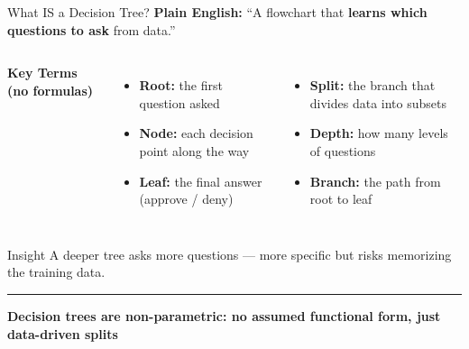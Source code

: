 \documentclass[8pt,aspectratio=169]{beamer}
\newcommand{\bottomnote}[1]{%
\vfill
\vspace{-2mm}
\textcolor{mllavender2}{\rule{\textwidth}{0.4pt}}
\vspace{1mm}
\footnotesize
\textbf{#1}
}
\newenvironment{compactlist}{%
  \begin{itemize}%
    \setlength{\itemsep}{2pt}%
    \setlength{\parskip}{0pt}%
    \setlength{\parsep}{0pt}%
}{%
  \end{itemize}%
}
\newcommand{\highlight}[1]{\textcolor{mlorange}{\textbf{#1}}}
\begin{document}
\begin{frame}[t]{What IS a Decision Tree?}
\small
\textbf{Plain English:} ``A flowchart that \highlight{learns which questions to ask} from data.''

\vspace{3mm}
\footnotesize
\begin{columns}[T]
\textbf{Key Terms (no formulas)}
\begin{compactlist}
\item \footnotesize \textbf{Root:} the first question asked
\item \footnotesize \textbf{Node:} each decision point along the way
\item \footnotesize \textbf{Leaf:} the final answer (approve / deny)
\end{compactlist}

\begin{compactlist}
\item \footnotesize \textbf{Split:} the branch that divides data into subsets
\item \footnotesize \textbf{Depth:} how many levels of questions
\item \footnotesize \textbf{Branch:} the path from root to leaf
\end{compactlist}
\end{columns}

\vspace{3mm}
\begin{block}{Insight}
\footnotesize A deeper tree asks more questions --- more specific but risks memorizing the training data.
\end{block}
\bottomnote{Decision trees are \textbf{non-parametric}: no assumed functional form, just data-driven splits}
\end{frame}
\end{document}
